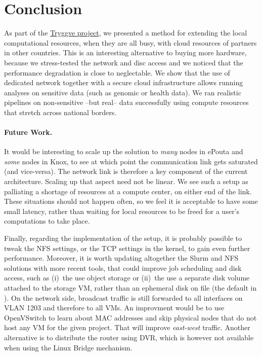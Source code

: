 \section{Conclusion}
\label{section:conclusion}

As part of the \href{https://wiki.neic.no/wiki/Tryggve}{Tryggve
  project}, we presented a method for extending the local
computational resources, when they are all busy, with cloud resources
of partners in other countries.
%
This is an interesting alternative to buying more hardware, because we
stress-tested the network and disc access and we noticed that the
performance degradation is close to neglectable.
%
We show that the use of dedicated network together with a secure cloud
infrastructure allows running analyses on sensitive data (such as
genomic or health data).
%
We ran realistic pipelines on non-sensitive --but real-- data
successfully using compute resources that stretch across national
borders.
%

\paragraph{Future Work.}
%
It would be interesting to scale up the solution to \emph{many} nodes
in ePouta and \emph{some} nodes in Knox, to see
at which point the communication link gets saturated (and vice-versa).
%
The network link is therefore a key component of the current
architecture.
%
Scaling up that aspect need not be linear. We see such a setup as
palliating a shortage of resources at a compute center, on either end
of the link. These situations should not happen often, so we feel it
is acceptable to have some small latency, rather than waiting for
local resources to be freed for a user's computations to take place.

%
Finally, regarding the implementation of the setup,
%
it is probably possible to tweak the NFS settings, or the TCP settings
in the kernel, to gain even further performance.
%
Moreover, it is worth updating altogether the Slurm and NFS solutions
with more recent tools, that could improve job scheduling and disk
access, such as (i)~the use object storage or (ii)~the use a separate
disk volume attached to the storage VM, rather than an ephemeral disk
on file (\ie the default in ).
%
On the network side, broadcast traffic is still forwarded to all
interfaces on VLAN 1203 and therefore to all VMs. An improvment would
be to use OpenVSwitch to learn about MAC addresses and skip physical
nodes that do not host any VM for the given project. That will improve
\emph{east-west} traffic. Another alternative is to distribute the
router using DVR, which is however not available when using the Linux
Bridge mechanism.

